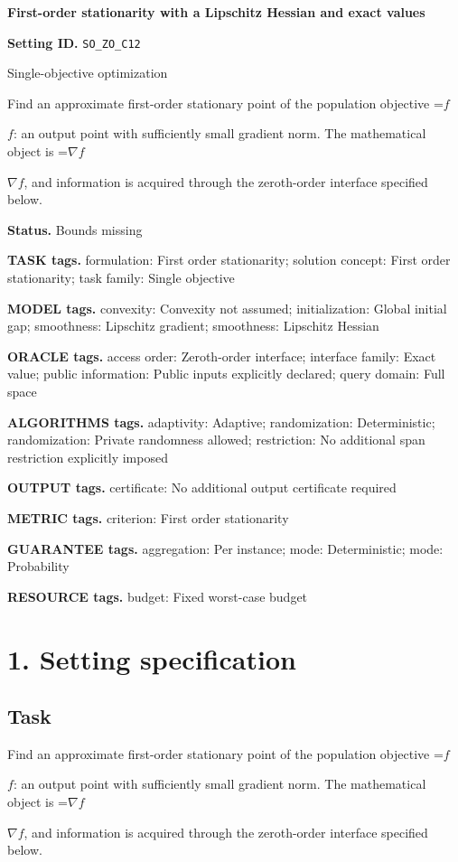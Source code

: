 \documentclass[10pt,a4paper]{article}
\newcommand{\AtlasMath}[1]{\par\begingroup\centering\setbox0=\hbox{$\displaystyle #1$}\ifdim\wd0>1.4\linewidth\typeout{ATLAS WIDE FORMULA: \the\wd0}\fi\ifdim\wd0>\linewidth\resizebox{\linewidth}{!}{\box0}\else\box0\fi\par\endgroup}
\newcommand{\AtlasInlineMath}[1]{\begingroup\setbox0=\hbox{$#1$}\ifdim\wd0>.4\linewidth\endgroup\AtlasMath{#1}\else\endgroup$#1$\fi}
\begin{document}
\raggedright

{\LARGE\bfseries\sffamily\color{AtlasNavy} First-order stationarity with a Lipschitz Hessian and exact values\par}\vspace{5pt}
\textbf{Setting ID.} \texttt{SO\_\allowbreak{}ZO\_\allowbreak{}C12}

Single-objective optimization

Find an approximate first-order stationary point of the population objective \AtlasInlineMath{f}: an output point with sufficiently small gradient norm. The mathematical object is \AtlasInlineMath{\nabla f}, and information is acquired through the zeroth-order interface specified below.

\textbf{Status.} Bounds missing

\textbf{TASK tags.} formulation: First order stationarity; solution concept: First order stationarity; task family: Single objective

\textbf{MODEL tags.} convexity: Convexity not assumed; initialization: Global initial gap; smoothness: Lipschitz gradient; smoothness: Lipschitz Hessian

\textbf{ORACLE tags.} access order: Zeroth-order interface; interface family: Exact value; public information: Public inputs explicitly declared; query domain: Full space

\textbf{ALGORITHMS tags.} adaptivity: Adaptive; randomization: Deterministic; randomization: Private randomness allowed; restriction: No additional span restriction explicitly imposed

\textbf{OUTPUT tags.} certificate: No additional output certificate required

\textbf{METRIC tags.} criterion: First order stationarity

\textbf{GUARANTEE tags.} aggregation: Per instance; mode: Deterministic; mode: Probability

\textbf{RESOURCE tags.} budget: Fixed worst-case budget

\section{1. Setting specification}
\subsection{Task}
Find an approximate first-order stationary point of the population objective \AtlasInlineMath{f}: an output point with sufficiently small gradient norm. The mathematical object is \AtlasInlineMath{\nabla f}, and information is acquired through the zeroth-order interface specified below.
\end{document}
